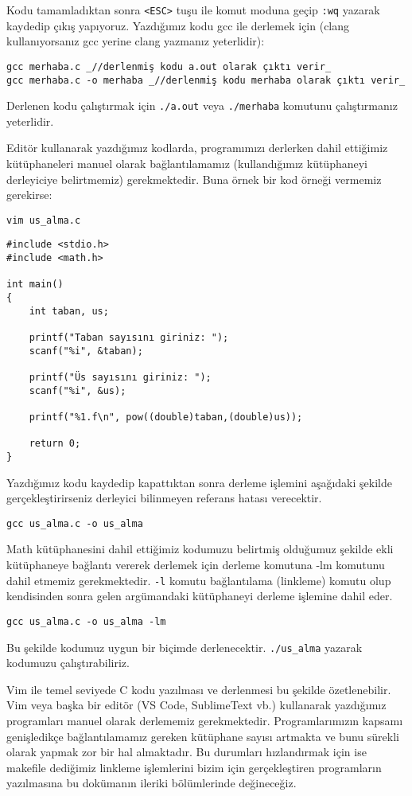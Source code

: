 \documentclass[
]{book}
\begin{document}
Kodu tamamladıktan sonra \texttt{\textless{}ESC\textgreater{}} tuşu ile komut moduna geçip \texttt{:wq} yazarak kaydedip çıkış yapıyoruz. Yazdığımız kodu gcc ile derlemek için (clang kullanıyorsanız gcc yerine clang yazmanız yeterlidir):

\texttt{gcc\ merhaba.c\ \_//derlenmiş\ kodu\ a.out\ olarak\ çıktı\ verir\_}
\texttt{gcc\ merhaba.c\ -o\ merhaba\ \_//derlenmiş\ kodu\ merhaba\ olarak\ çıktı\ verir\_}

Derlenen kodu çalıştırmak için \texttt{./a.out} veya \texttt{./merhaba} komutunu çalıştırmanız yeterlidir.

Editör kullanarak yazdığımız kodlarda, programımızı derlerken dahil ettiğimiz kütüphaneleri manuel olarak bağlantılamamız (kullandığımız kütüphaneyi derleyiciye belirtmemiz) gerekmektedir. Buna örnek bir kod örneği vermemiz gerekirse:

\texttt{vim\ us\_alma.c}

\begin{verbatim}
#include <stdio.h>
#include <math.h>

int main()
{
    int taban, us; 
  
    printf("Taban sayısını giriniz: ");
    scanf("%i", &taban);
  
    printf("Üs sayısını giriniz: ");
    scanf("%i", &us);

    printf("%1.f\n", pow((double)taban,(double)us));

    return 0;
}
\end{verbatim}

Yazdığımız kodu kaydedip kapattıktan sonra derleme işlemini aşağıdaki şekilde gerçekleştirirseniz derleyici bilinmeyen referans hatası verecektir.

\texttt{gcc\ us\_alma.c\ -o\ us\_alma}

Math kütüphanesini dahil ettiğimiz kodumuzu belirtmiş olduğumuz şekilde ekli kütüphaneye bağlantı vererek derlemek için derleme komutuna -lm komutunu dahil etmemiz gerekmektedir. \texttt{-l} komutu bağlantılama (linkleme) komutu olup kendisinden sonra gelen argümandaki kütüphaneyi derleme işlemine dahil eder.

\texttt{gcc\ us\_alma.c\ -o\ us\_alma\ -lm}

Bu şekilde kodumuz uygun bir biçimde derlenecektir. \texttt{./us\_alma} yazarak kodumuzu çalıştırabiliriz.

Vim ile temel seviyede C kodu yazılması ve derlenmesi bu şekilde özetlenebilir. Vim veya başka bir editör (VS Code, SublimeText vb.) kullanarak yazdığımız programları manuel olarak derlememiz gerekmektedir. Programlarımızın kapsamı genişledikçe bağlantılamamız gereken kütüphane sayısı artmakta ve bunu sürekli olarak yapmak zor bir hal almaktadır. Bu durumları hızlandırmak için ise makefile dediğimiz linkleme işlemlerini bizim için gerçekleştiren programların yazılmasına bu dokümanın ileriki bölümlerinde değineceğiz.
\end{document}
